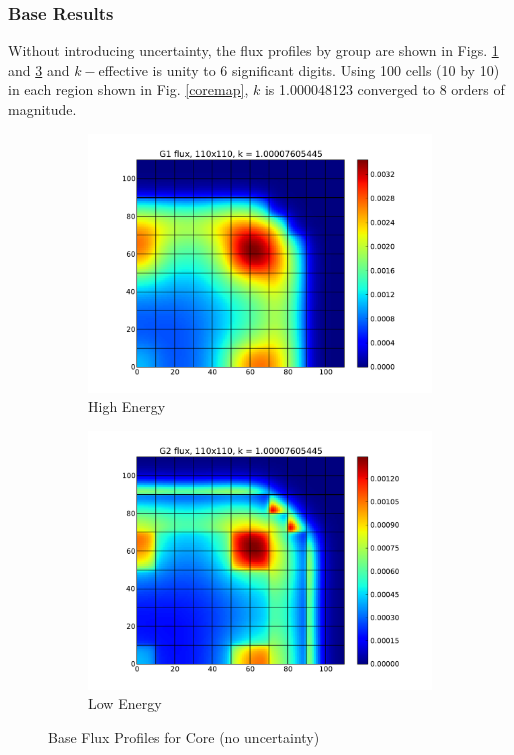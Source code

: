 \subsubsection{Base Results}
Without introducing uncertainty, the flux profiles by group are shown in Figs. \ref{figg1} and \ref{figg2} and $k-$effective is unity to 6 significant digits.  Using 100 cells (10 by 10) in each region shown in Fig. \ref{coremap}, $k$ is 1.000048123 converged to 8 orders of magnitude.
\begin{figure}[h]
\centering
  \begin{subfigure}[b]{0.45 \textwidth}
   \includegraphics[width=\textwidth]{./graphics/g1_50_flux}
   \caption{High Energy}
   \label{figg1}
  \end{subfigure}
  \begin{subfigure}[b]{0.45\textwidth}
   \includegraphics[width=\textwidth]{./graphics/g2_50_flux}
   \caption{Low Energy}
   \label{figg2}
  \end{subfigure}
\caption{Base Flux Profiles for Core (no uncertainty)}
\end{figure}

